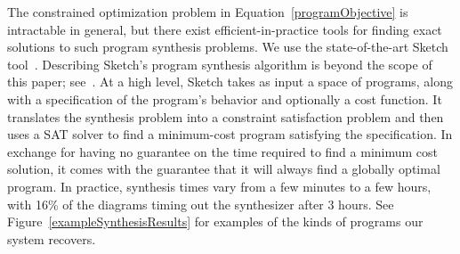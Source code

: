 \documentclass{article}
\begin{document}
The constrained optimization problem in
Equation~\ref{programObjective} is intractable in general, but there
exist efficient-in-practice tools for finding exact solutions to such
program synthesis problems. We use the state-of-the-art Sketch
tool~\cite{solar2008program}. Describing Sketch's program synthesis
algorithm is beyond the scope of this paper; see~\cite{solar2008program}.  At a
high level, Sketch takes as input a space of programs, along with a
specification of the program's behavior and optionally a cost
function.  It translates the synthesis problem into a constraint
satisfaction problem and then uses a SAT solver to find a
minimum-cost program satisfying the specification.  In exchange for
having no guarantee on the time required to find a minimum
cost solution, it comes with the guarantee that it will always find a
globally optimal program.
In practice, synthesis times vary from a few minutes to a few hours,
with 16\% of the diagrams timing out the synthesizer after 3 hours.
See Figure~\ref{exampleSynthesisResults} for examples of the kinds of programs our system recovers.

\newcommand{\exampleProgramSize}{6cm}
\newcommand{\exampleTraceSize}{4.5cm}
\newcommand{\exampleDrawingSize}{2cm}
\end{document}
